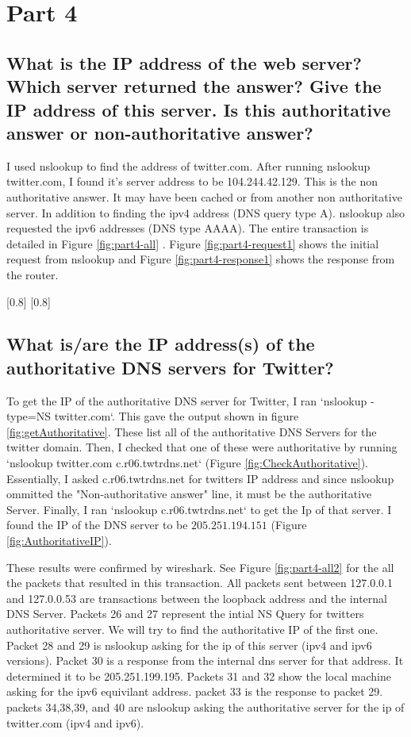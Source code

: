 \documentclass{assignment-x}
\begin{document}
\section{Part 4}

\subsection{What is the IP address of the web server? Which server returned the answer? Give the IP address of this server. Is this authoritative answer or non-authoritative answer?}
I used nslookup to find the address of twitter.com. After running nslookup twitter.com, I found it's server address to be 104.244.42.129. This is the non authoritative answer. It may have been cached or from another non authoritative server. In addition to finding the ipv4 address (DNS query type A). nslookup also requested the ipv6 addresses (DNS type AAAA). The entire transaction is detailed in Figure \ref{fig:part4-all} . Figure \ref{fig:part4-request1} shows the initial request from  nslookup and Figure \ref{fig:part4-response1} shows the response from the router.

[0.8\linewidth]
[0.8\linewidth]


\subsection{What is/are the IP address(s) of the authoritative DNS servers for Twitter?}
To get the IP of the authoritative DNS server for Twitter, I ran `nslookup -type=NS twitter.com`. This gave the output shown in figure \ref{fig:getAuthoritative}. These list all of the authoritative DNS Servers for the twitter domain. Then, I checked that one of these were authoritative by running `nslookup twitter.com c.r06.twtrdns.net` (Figure \ref{fig:CheckAuthoritative}). Essentially, I asked c.r06.twtrdns.net for twitters IP address and since nslookup ommitted the "Non-authoritative answer" line, it must be the authoritative Server. Finally, I ran `nslookup c.r06.twtrdns.net` to get the Ip of that server. I found the IP of the DNS server to be $205.251.194.151$ (Figure \ref{fig:AuthoritativeIP}).

These results were confirmed by wireshark. See Figure \ref{fig:part4-all2} for the all the packets that resulted in this transaction. All packets sent between 127.0.0.1 and 127.0.0.53 are transactions between the loopback address and the internal DNS Server. Packets 26 and 27 represent the intial NS Query for twitters authoritative server. We will try to find the authoritative IP of the first one. Packet 28 and 29 is nslookup asking for the ip of this server (ipv4 and ipv6 versions).  Packet 30 is a response from the internal dns server for that address. It determined it to be 205.251.199.195. Packets 31 and 32 show the local machine asking for the ipv6 equivilant address. packet 33 is the response to packet 29. packets 34,38,39, and 40 are nslookup asking the authoritative server for the ip of twitter.com (ipv4 and ipv6).
\end{document}
